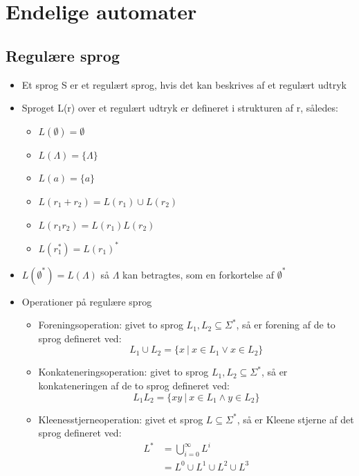 \documentclass[a4, danish]{article}
\begin{document}
\newpage  
\section{Endelige automater}
  \subsection{Regulære sprog}
  \begin{itemize}
    \item Et sprog S er et regulært sprog, hvis det kan beskrives af et regulært udtryk
    \item Sproget L(r) over et regulært udtryk er defineret i strukturen af r, således: 
    \begin{itemize}
      \item $L(\emptyset)=\emptyset $
      \item $L(\Lambda)=\{ \Lambda \}$
      \item $L(a)=\{a\}$
      \item $L(r_1+r_2)=L(r_1)\cup L(r_2)$
      \item $L(r_1r_2)=L(r_1)L(r_2)$
      \item $L(r_1^*)=L(r_1)^*$
    \end{itemize}
    \item $L( \emptyset^*)=L(\Lambda)$ så $\Lambda$ kan betragtes, som en forkortelse af $\emptyset^*$
    \item Operationer på regulære sprog
    \begin{itemize}
	    \item Foreningsoperation: givet to sprog $L_1,L_2\subseteq \Sigma^*$, så er forening af de to sprog defineret ved:
      \begin{equation*}
        L_1\cup L_2 = \{x \ | \ x\in L_1 \lor x\in L_2 \}
      \end{equation*}
      \item Konkateneringsoperation: givet to sprog $L_1,L_2\subseteq \Sigma^*$, så er konkateneringen af de to sprog defineret ved:
      \begin{equation*}
        L_1L_2= \{xy \ | \ x\in L_1 \land y\in L_2 \}
       \end{equation*}
      \item Kleenesstjerneoperation: givet et sprog $L \subseteq \Sigma^*$, så er Kleene stjerne af det sprog defineret ved:
      \begin{align*}
        L^* &= \bigcup_{i=0}^{\infty} L^i \\
            &= L^0\cup L^1 \cup L^2 \cup L^3  \\

\end{align*}
\end{itemize}
\end{itemize}
\end{document}
